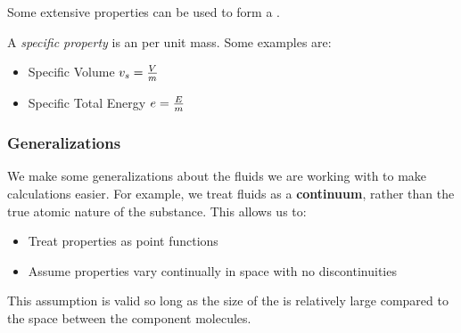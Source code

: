 Some extensive properties can be used to form a .
\begin{definition}\label{def:Specific_Property}
  A \emph{specific property} is an  per unit mass.
  Some examples are:
  \begin{itemize}[noitemsep]
  \item Specific Volume $v_{s} = \frac{V}{m}$
  \item Specific Total Energy $e = \frac{E}{m}$
  \end{itemize}
\end{definition}

\subsubsection{Generalizations}\label{subsubsec:Generalizations}
We make some generalizations about the fluids we are working with to make calculations easier.
For example, we treat fluids as a \textbf{continuum}, rather than the true atomic nature of the substance.
This allows us to:
\begin{itemize}[noitemsep]
\item Treat properties as point functions
\item Assume properties vary continually in space with no discontinuities
\end{itemize}

This assumption is valid so long as the size of the  is relatively large compared to the space between the component molecules.

